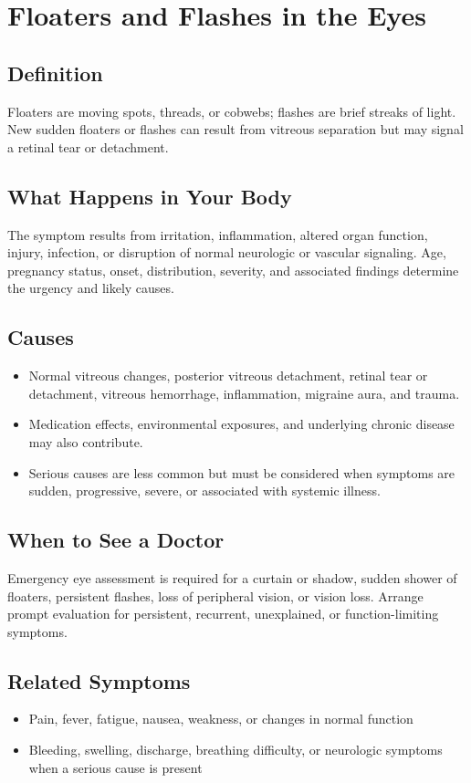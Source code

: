 \chapter{Floaters and Flashes in the Eyes}

\section*{Definition}
Floaters are moving spots, threads, or cobwebs; flashes are brief streaks of light. New sudden floaters or flashes can result from vitreous separation but may signal a retinal tear or detachment.

\section*{What Happens in Your Body}
The symptom results from irritation, inflammation, altered organ function, injury, infection, or disruption of normal neurologic or vascular signaling. Age, pregnancy status, onset, distribution, severity, and associated findings determine the urgency and likely causes.

\section*{Causes}
\begin{itemize}
  \item Normal vitreous changes, posterior vitreous detachment, retinal tear or detachment, vitreous hemorrhage, inflammation, migraine aura, and trauma.
  \item Medication effects, environmental exposures, and underlying chronic disease may also contribute.
  \item Serious causes are less common but must be considered when symptoms are sudden, progressive, severe, or associated with systemic illness.
\end{itemize}

\section*{When to See a Doctor}
Emergency eye assessment is required for a curtain or shadow, sudden shower of floaters, persistent flashes, loss of peripheral vision, or vision loss. Arrange prompt evaluation for persistent, recurrent, unexplained, or function-limiting symptoms.

\section*{Related Symptoms}
\begin{itemize}
  \item Pain, fever, fatigue, nausea, weakness, or changes in normal function
  \item Bleeding, swelling, discharge, breathing difficulty, or neurologic symptoms when a serious cause is present
\end{itemize}

